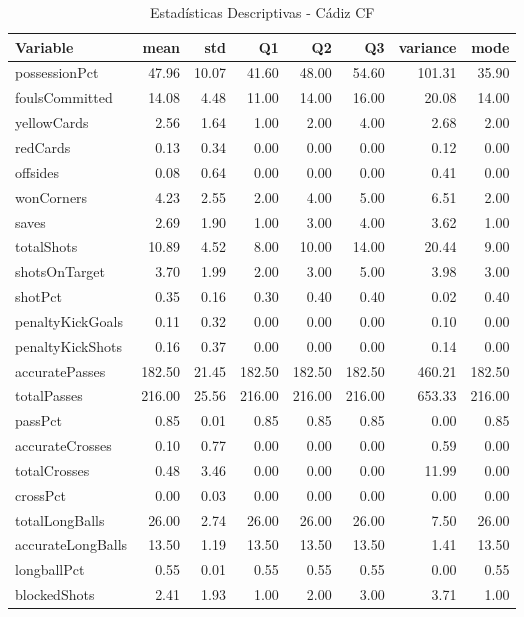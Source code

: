 \begin{table}[H]
\centering
\caption{Estadísticas Descriptivas - Cádiz CF}
\label{tab:esp_cadiz}
\small
\begin{tabular}{lrrrrrrr}
\hline
Variable & mean & std & Q1 & Q2 & Q3 & variance & mode \\
\hline
possessionPct & 47.96 & 10.07 & 41.60 & 48.00 & 54.60 & 101.31 & 35.90 \\
foulsCommitted & 14.08 & 4.48 & 11.00 & 14.00 & 16.00 & 20.08 & 14.00 \\
yellowCards & 2.56 & 1.64 & 1.00 & 2.00 & 4.00 & 2.68 & 2.00 \\
redCards & 0.13 & 0.34 & 0.00 & 0.00 & 0.00 & 0.12 & 0.00 \\
offsides & 0.08 & 0.64 & 0.00 & 0.00 & 0.00 & 0.41 & 0.00 \\
wonCorners & 4.23 & 2.55 & 2.00 & 4.00 & 5.00 & 6.51 & 2.00 \\
saves & 2.69 & 1.90 & 1.00 & 3.00 & 4.00 & 3.62 & 1.00 \\
totalShots & 10.89 & 4.52 & 8.00 & 10.00 & 14.00 & 20.44 & 9.00 \\
shotsOnTarget & 3.70 & 1.99 & 2.00 & 3.00 & 5.00 & 3.98 & 3.00 \\
shotPct & 0.35 & 0.16 & 0.30 & 0.40 & 0.40 & 0.02 & 0.40 \\
penaltyKickGoals & 0.11 & 0.32 & 0.00 & 0.00 & 0.00 & 0.10 & 0.00 \\
penaltyKickShots & 0.16 & 0.37 & 0.00 & 0.00 & 0.00 & 0.14 & 0.00 \\
accuratePasses & 182.50 & 21.45 & 182.50 & 182.50 & 182.50 & 460.21 & 182.50 \\
totalPasses & 216.00 & 25.56 & 216.00 & 216.00 & 216.00 & 653.33 & 216.00 \\
passPct & 0.85 & 0.01 & 0.85 & 0.85 & 0.85 & 0.00 & 0.85 \\
accurateCrosses & 0.10 & 0.77 & 0.00 & 0.00 & 0.00 & 0.59 & 0.00 \\
totalCrosses & 0.48 & 3.46 & 0.00 & 0.00 & 0.00 & 11.99 & 0.00 \\
crossPct & 0.00 & 0.03 & 0.00 & 0.00 & 0.00 & 0.00 & 0.00 \\
totalLongBalls & 26.00 & 2.74 & 26.00 & 26.00 & 26.00 & 7.50 & 26.00 \\
accurateLongBalls & 13.50 & 1.19 & 13.50 & 13.50 & 13.50 & 1.41 & 13.50 \\
longballPct & 0.55 & 0.01 & 0.55 & 0.55 & 0.55 & 0.00 & 0.55 \\
blockedShots & 2.41 & 1.93 & 1.00 & 2.00 & 3.00 & 3.71 & 1.00 \\

\end{tabular}
\end{table}
